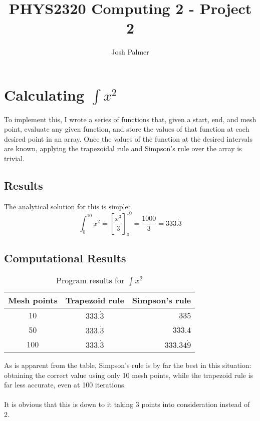 \documentclass[10pt,fleqn,a4paper]{article} %
\title{PHYS2320 Computing 2 - Project 2}
\author{Josh Palmer}
\renewcommand{\=}[1]{\stackrel{#1}{=}} %
\theoremstyle{definition}
\theoremstyle{remark}
\begin{document}
\maketitle
\section{Calculating $\int x^2$}
To implement this, I wrote a series of functions that, given a start, end, and mesh point, evaluate any given function, and store the values of that function at each desired point in an array. Once the values of the function at the desired intervals are known, applying the trapezoidal rule and Simpson's rule over the array is trivial.

\subsection{Results}

The analytical solution for this is simple:
\[
 \int_0^{10} x^2 = \left[ \frac{x^3}{3} \right]_0^{10} = \frac{1000}{3} = 333.\dot{3}
\]
\subsection{Computational Results}

\begin{table}[htbp]
  \centering
  \caption{Program results for $\int x^2$}
    \begin{tabular}{rrr}
    \toprule
    Mesh points & Trapezoid rule & Simpson's rule \\
    \midrule
    \multicolumn{1}{c}{10} & \multicolumn{1}{c}{$333.\dot{3}$} & 335 \\
    \multicolumn{1}{c}{50} & \multicolumn{1}{c}{$333.\dot{3}$} & 333.4 \\
    \multicolumn{1}{c}{100} & \multicolumn{1}{c}{$333.\dot{3}$} & $333.34\dot{9}$ \\
    \bottomrule
    \end{tabular}%
  \label{tab:addlabel}%
\end{table}%


As is apparent from the table, Simpson's rule is by far the best in this situation: obtaining the correct value using only 10 mesh points, while the trapezoid rule is far less accurate, even at 100 iterations.
\\\\
It is obvious that this is down to it taking 3 points into consideration instead of 2.
\end{document}
